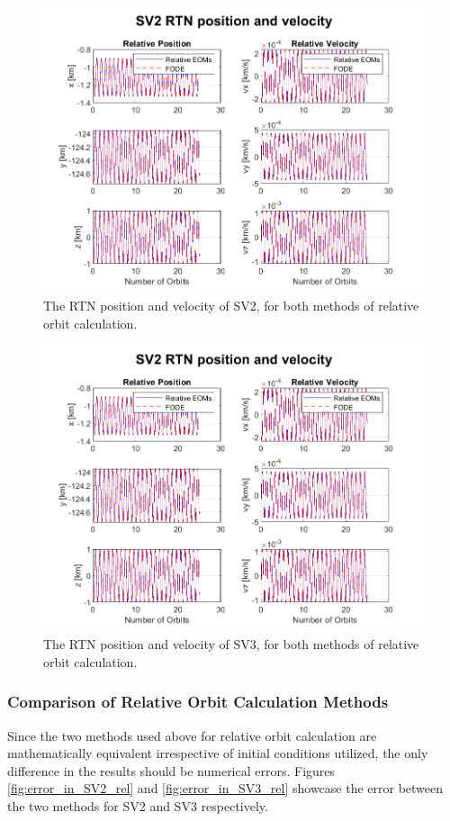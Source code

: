 \begin{figure}[H]
    \centering
    \includegraphics[width=0.7\linewidth]{sim/figures/SV2_rel_pos_vel.png}
    \caption{The RTN position and velocity of SV2, for both methods of relative orbit calculation.}
    \label{fig:rel_pos_vel_rtn_sv2}
\end{figure}

\begin{figure}[H]
    \centering
    \includegraphics[width=0.7\linewidth]{sim/figures/SV2_rel_pos_vel.png}
    \caption{The RTN position and velocity of SV3, for both methods of relative orbit calculation.}
    \label{fig:rel_pos_vel_rtn_sv3}
\end{figure}

\subsubsection{Comparison of Relative Orbit Calculation Methods}
Since the two methods used above for relative orbit calculation are mathematically equivalent irrespective of initial conditions utilized, the only difference in the results should be numerical errors. Figures \ref{fig:error_in_SV2_rel} and \ref{fig:error_in_SV3_rel} showcase the error between the two methods for SV2 and SV3 respectively.


